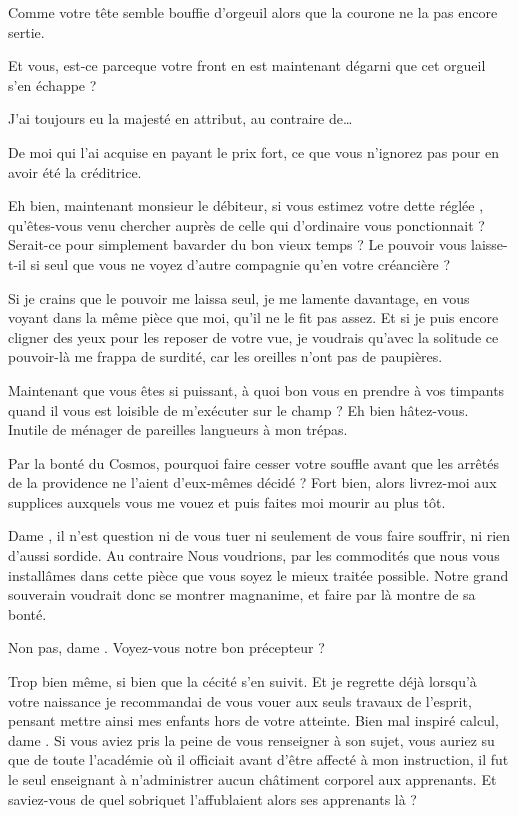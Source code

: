 \begin{drama}
  \reinespeaks Comme votre tête semble bouffie d’orgeuil alors que la courone ne la pas encore sertie.

  \elenaspeaks Et vous, est-ce parceque votre front en est maintenant dégarni que cet orgueil s’en échappe ?

  \reinespeaks J’ai toujours eu la majesté en attribut, au contraire de…

  \elenaspeaks De moi qui l’ai acquise en payant le prix fort, ce que vous n’ignorez pas pour en avoir été la créditrice.

  \reinespeaks Eh bien, maintenant monsieur le débiteur, si vous estimez votre dette réglée , qu’êtes-vous venu chercher auprès de celle qui d’ordinaire vous ponctionnait ? Serait-ce pour simplement bavarder du bon vieux temps ? Le pouvoir vous laisse-t-il si seul que vous ne voyez d’autre compagnie qu’en votre créancière ?

  \elenaspeaks Si je crains que le pouvoir me laissa seul, je me lamente davantage, en vous voyant dans la même pièce que moi, qu’il ne le fit pas assez. Et si je puis encore cligner des yeux pour les reposer de votre vue, je voudrais qu’avec la solitude ce pouvoir-là me frappa de surdité, car les oreilles n’ont pas de paupières.

  \reinespeaks Maintenant que vous êtes si puissant, à quoi bon vous en prendre à vos timpants quand il vous est loisible de m’exécuter sur le champ ? Eh bien hâtez-vous. Inutile de ménager de pareilles langueurs à mon trépas.

  \elenaspeaks Par la bonté du Cosmos, pourquoi faire cesser votre souffle avant que les arrêtés de la providence ne l’aient d’eux-mêmes décidé ?
  \reinespeaks Fort bien, alors livrez-moi aux supplices auxquels vous me vouez et puis faites moi mourir au plus tôt.

  \elenaspeaks Dame \reine, il n’est question ni de vous tuer ni seulement de vous faire souffrir, ni rien d’aussi sordide. Au contraire Nous voudrions, par les commodités que nous vous installâmes dans cette pièce que vous soyez le mieux traitée possible.
  \reinespeaks Notre grand souverain voudrait donc se montrer magnanime, et faire par là montre de sa bonté.

  \elenaspeaks {} Non pas, dame \reine. Voyez-vous notre bon précepteur \alexas ?

  \reinespeaks Trop bien même, si bien que la cécité s’en suivit. Et je regrette déjà lorsqu’à votre naissance je recommandai de vous vouer aux seuls travaux de l’esprit, pensant mettre ainsi mes enfants hors de votre atteinte.
  \elenaspeaks Bien mal inspiré calcul, dame \reine. Si vous aviez pris la peine de vous renseigner à son sujet, vous auriez su que de toute l’académie où il officiait avant d’être affecté à mon instruction, il fut le seul enseignant à n’administrer aucun châtiment corporel aux apprenants. Et saviez-vous de quel sobriquet l’affublaient alors ses apprenants là ?


\end{drama}
